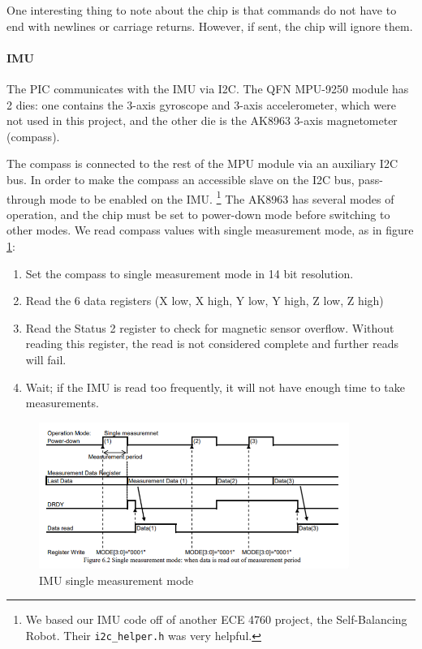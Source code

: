 \documentclass[]{article}
\let\oldparagraph\paragraph
\renewcommand{\paragraph}[1]{\oldparagraph{#1}\mbox{}}
\begin{document}
One interesting thing to note about the chip is that commands do not have to end with newlines or carriage returns.
However, if sent, the chip will ignore them.

\paragraph{IMU}

The PIC communicates with the IMU via I2C. The QFN MPU-9250 \cite{mpu9250datasheet} \cite{mpu9250regmap} module has 2 dies:
one contains the 3-axis gyroscope and 3-axis accelerometer, which were not
used in this project, and the other die is the AK8963 3-axis
magnetometer (compass). \cite{ak8963cdatasheet}

The compass is connected to the rest of the MPU module via an auxiliary I2C bus.
In order to make the compass an accessible slave on the I2C bus, pass-through mode to be enabled on the IMU.
\footnote{We based our IMU code off of another ECE 4760 project, the Self-Balancing Robot. \cite{selfbalancingrobot} Their \texttt{i2c\_helper.h} was very helpful.}
The AK8963 has several modes of operation, and the chip must be set to power-down mode before switching to other modes.
We read compass values with single measurement mode, as in figure \ref{fig:imu_single_measurement}:

\begin{enumerate}
\item
  Set the compass to single measurement mode in 14 bit resolution.
\item
  Read the 6 data registers (X low, X high, Y low, Y high, Z low, Z
  high)
\item
  Read the Status 2 register to check for magnetic sensor overflow.
  Without reading this register, the read is not considered complete and
  further reads will fail.
\item
  Wait; if the IMU is read too frequently, it will not have enough time
  to take measurements.
\end{enumerate}

\begin{figure}
  \centering
  \includegraphics[width=0.9\textwidth]{imu_single_measurement.png}
  \caption{IMU single measurement mode}
  \label{fig:imu_single_measurement}
\end{figure}
\end{document}

